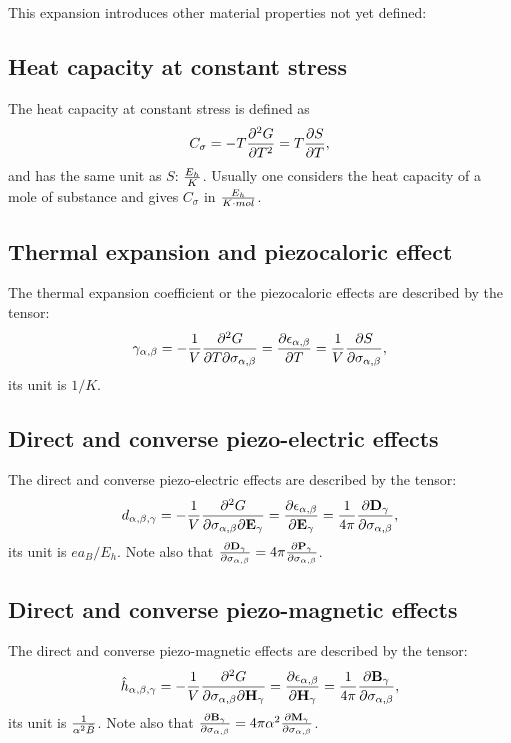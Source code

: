 \documentclass[12pt,a4paper]{article}
\begin{document}
{This expansion introduces other material properties not yet defined:
\subsection{\color{web-blue}Heat capacity at constant stress}
The heat capacity at constant stress is defined as
\begin{equation}
C_\sigma= - T {\partial^2 G \over \partial T^2} = 
T {\partial S \over \partial T},
\end{equation}
and has the same unit as $S$: $E_h\over K$. Usually one considers the heat
capacity of a mole of substance and gives $C_\sigma$ in 
${E_h \over K \cdot mol}$.

\subsection{\color{web-blue}Thermal expansion and piezocaloric effect}
The thermal expansion coefficient or the piezocaloric effects are
described by the tensor:
\begin{equation}
\gamma_{\alpha,\beta}=-{1\over V} {\partial^2 G \over \partial T 
\partial \sigma_{\alpha,\beta}}={\partial \epsilon_{\alpha,\beta} \over 
\partial T}= {1\over V}
{\partial S \over \partial \sigma_{\alpha,\beta}},
\end{equation}
its unit is $1/K$.

\subsection{\color{web-blue}Direct and converse piezo-electric effects}
The direct and converse piezo-electric effects are described by the 
tensor:
\begin{equation}
d_{\alpha,\beta,\gamma}=-{1\over V} {\partial^2 G \over
\partial \sigma_{\alpha,\beta} \partial {\bf E}_\gamma}=
{\partial \epsilon_{\alpha,\beta} \over \partial {\bf E}_\gamma}= 
{1\over 4 \pi} {\partial {\bf D}_\gamma \over \partial \sigma_{\alpha,\beta}},
\end{equation}
its unit is $e a_B/E_h$. Note also that 
${\partial {\bf D}_\gamma \over \partial \sigma_{\alpha,\beta}}
=4 \pi {\partial {\bf P}_\gamma \over \partial \sigma_{\alpha,\beta}}$.

\subsection{\color{web-blue}Direct and converse piezo-magnetic effects}
The direct and converse piezo-magnetic effects are described by the 
tensor:
\begin{equation}
\hat h_{\alpha,\beta,\gamma}=-{1\over V} {\partial^2 G \over
\partial \sigma_{\alpha,\beta} \partial {\bf H}_\gamma}= 
{\partial \epsilon_{\alpha,\beta} \over \partial {\bf H}_\gamma}= 
{1 \over 4 \pi}{\partial {\bf B}_\gamma \over \partial \sigma_{\alpha,\beta}},
\end{equation}
its unit is ${1 \over \alpha^2 \bar B}$. Note also that 
${\partial {\bf B}_\gamma \over \partial \sigma_{\alpha,\beta}}
=4\pi \alpha^2 {\partial {\bf M}_\gamma \over \partial \sigma_{\alpha,\beta}}$.

}
\end{document}
